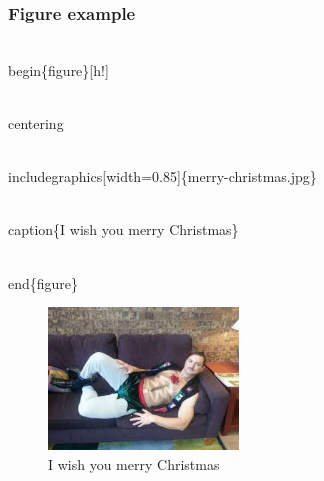 \documentclass[10pt]{beamer}
\begin{document}
\begin{frame}
  \frametitle{Figure example}
  
  \begin{center}
  \begin{semiverbatim}

\\begin\{figure\}[h!]

\\centering\

\\includegraphics[width=0.85\textwidth]\{merry-christmas.jpg\}

\\caption\{I wish you merry Christmas\}

\\end\{figure\}

  \end{semiverbatim}
  \end{center}
  
  \begin{center}
    
    \begin{figure}[!h]
  \centering
 \includegraphics[width=0.45\textwidth]{merry-christmas.jpg}
 \caption{I wish you merry Christmas}
   \end{figure}
    
       
   \end{center}

\end{frame}
\end{document}
